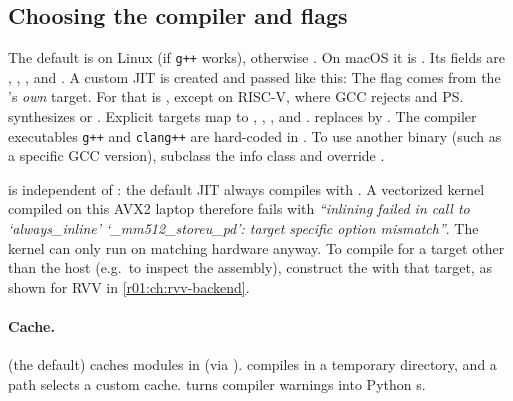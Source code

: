 \subsection{Choosing the compiler and flags}
The default  is  on Linux (if \texttt{g++} works),
otherwise . On macOS it is . Its fields are
, , ,
 and . A custom JIT is created
and passed like this:
The  flag comes from the 's \emph{own} target. For
 that is , except on RISC-V, where GCC rejects
 and \ps{} synthesizes  or
. Explicit targets map to ,
, ,  and
.  replaces  by
. The compiler executables \texttt{g++} and
\texttt{clang++} are hard-coded in . To use another binary (such as a
specific GCC version), subclass the info class and override .

\begin{pitfall}
   is independent of : the
  default JIT always compiles with . A vectorized
   kernel compiled on this AVX2 laptop therefore fails with
  \emph{``inlining failed in call to `always\_inline' `\_mm512\_storeu\_pd': target
  specific option mismatch''}. The kernel can only run on matching hardware anyway. To
  compile for a target other than the host (e.g.\ to inspect the assembly), construct
  the  with that target, as shown for RVV in \cref{r01:ch:rvv-backend}.
\end{pitfall}

\paragraph{Cache.}
 (the default) caches modules in
 (via ).  compiles in
a temporary directory, and a path selects a custom cache. 
turns compiler warnings into Python s.

